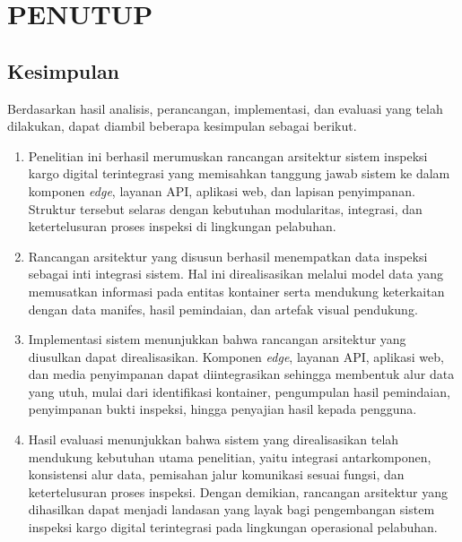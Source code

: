 \cleardoublepage
\chapter{PENUTUP}
\label{chap:penutup}

\section{Kesimpulan}

Berdasarkan hasil analisis, perancangan, implementasi, dan evaluasi yang telah
dilakukan, dapat diambil beberapa kesimpulan sebagai berikut.

\begin{enumerate}
    \item Penelitian ini berhasil merumuskan rancangan arsitektur sistem
    inspeksi kargo digital terintegrasi yang memisahkan tanggung jawab sistem ke
    dalam komponen \textit{edge}, layanan API, aplikasi web, dan lapisan
    penyimpanan. Struktur tersebut selaras dengan kebutuhan modularitas,
    integrasi, dan ketertelusuran proses inspeksi di lingkungan pelabuhan.

    \item Rancangan arsitektur yang disusun berhasil menempatkan data inspeksi
    sebagai inti integrasi sistem. Hal ini direalisasikan melalui model data
    yang memusatkan informasi pada entitas kontainer serta mendukung keterkaitan
    dengan data manifes, hasil pemindaian, dan artefak visual pendukung.

    \item Implementasi sistem menunjukkan bahwa rancangan arsitektur yang
    diusulkan dapat direalisasikan. Komponen \textit{edge}, layanan API,
    aplikasi web, dan media penyimpanan dapat diintegrasikan sehingga membentuk
    alur data yang utuh, mulai dari identifikasi kontainer, pengumpulan hasil
    pemindaian, penyimpanan bukti inspeksi, hingga penyajian hasil kepada
    pengguna.

    \item Hasil evaluasi menunjukkan bahwa sistem yang direalisasikan telah
    mendukung kebutuhan utama penelitian, yaitu integrasi antarkomponen,
    konsistensi alur data, pemisahan jalur komunikasi sesuai fungsi, dan
    ketertelusuran proses inspeksi. Dengan demikian, rancangan arsitektur yang
    dihasilkan dapat menjadi landasan yang layak bagi pengembangan sistem
    inspeksi kargo digital terintegrasi pada lingkungan operasional pelabuhan.
\end{enumerate}

